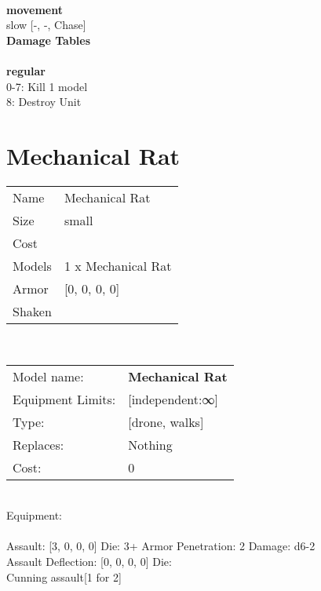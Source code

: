 \ \\
 
\ \\



\ \\ {\bf movement } \\
slow [-, -, Chase] \\


{\bf Damage Tables} \\
\ \\ {\bf regular } \\
0-7: Kill 1 model \\
8: Destroy Unit \\










\pagebreak\pagebreak

\section{ Mechanical Rat }

\begin{tabular}{ll}
  Name & Mechanical Rat \\
  Size & small\\
  Cost & \\
  Models & 1 x Mechanical Rat\\
  Armor & [0, 0, 0, 0]\\
  Shaken & \\
\end{tabular}

\noindent \\ 


\noindent
\begin{tabular}{ll}
Model name: &{\bf Mechanical Rat } \\
Equipment Limits: &[independent:∞] \\
Type: &[drone, walks] \\
Replaces: &Nothing \\
Cost: & 0\\
\end{tabular}
\ \\
Equipment:  \\
\ \\
Assault: [3, 0, 0, 0] Die: 3+ Armor Penetration: 2 Damage: d6-2 \\
Assault Deflection: [0, 0, 0, 0] Die: \\
\indent Cunning assault[1 for 2]\\ 
 
